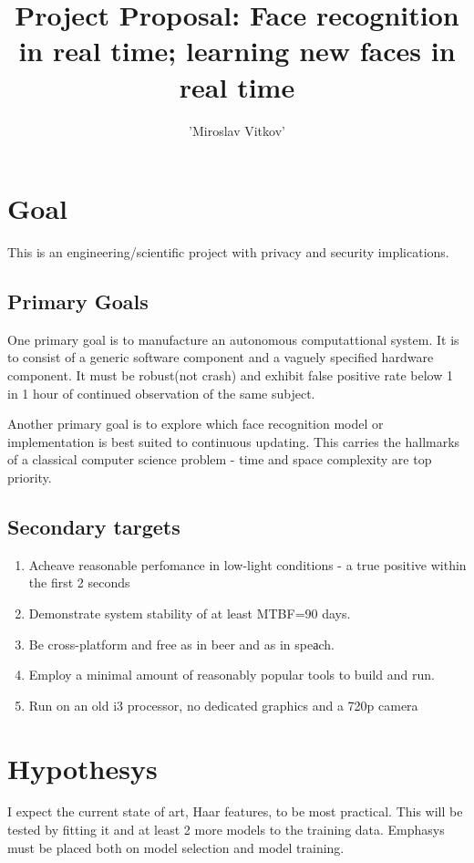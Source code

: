 \documentclass{article}
\title{Project Proposal: Face recognition in real time; learning new faces in real time}
\author{'Miroslav Vitkov'}
\begin{document}
\maketitle

\section{Goal}
This is an engineering/scientific project with privacy and security implications.

\subsection{Primary Goals}
One primary goal is to manufacture an autonomous computattional system.
It is to consist of a generic software component and a vaguely specified hardware component.
It must be robust(not crash) and exhibit false positive rate below 1 in 1 hour of continued observation of the same subject.
\par
Another primary goal is to explore which face recognition model or implementation is best suited to continuous updating.
This carries the hallmarks of a classical computer science problem - time and space complexity are top priority.

\subsection{Secondary targets}
\begin{enumerate}
    \item{Acheave reasonable perfomance in low-light conditions - a true positive within the first 2 seconds}
    \item{Demonstrate system stability of at least MTBF=90 days.}
    \item{Be cross-platform and free as in beer and as in speаch.}
    \item{Employ a minimal amount of reasonably popular tools to build and run.}
    \item{Run on an old i3 processor, no dedicated graphics and a 720p camera}
\end{enumerate}

\section{Hypothesys}
I expect the current state of art, Haar features, to be most practical.
This will be tested by fitting it and at least 2 more models to the training data.
Emphasys must be placed both on model selection and model training.
\end{document}
